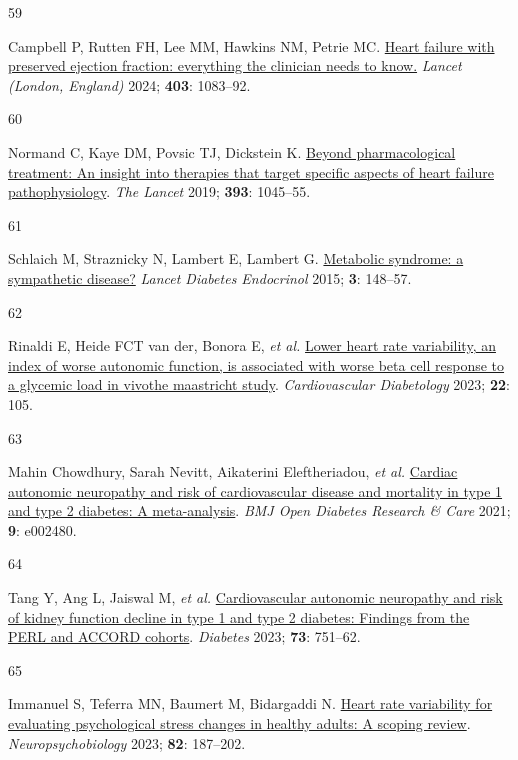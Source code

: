 \documentclass[
  a4paper,
  headsepline=true,
  open=left]{scrbook}
\newlength{\cslhangindent}
\newlength{\csllabelwidth}
\newlength{\cslentryspacingunit} %
\newenvironment{CSLReferences}[2] %
 {%
  \setlength{\parindent}{0pt}
  \ifodd #1
  \let\oldpar\par
  \def\par{\hangindent=\cslhangindent\oldpar}
  \fi
  \setlength{\parskip}{#2\cslentryspacingunit}
 }%
 {}
\newcommand{\CSLLeftMargin}[1]{\parbox[t]{\csllabelwidth}{#1}}
\newcommand{\CSLRightInline}[1]{\parbox[t]{\linewidth - \csllabelwidth}{#1}\break}
\begin{document}
\begin{CSLReferences}{0}{0}
\leavevmode{}%
\CSLLeftMargin{59 }%
\CSLRightInline{Campbell P, Rutten FH, Lee MM, Hawkins NM, Petrie MC.
\href{https://doi.org/10.1016/S0140-6736(23)02756-3}{Heart failure with
preserved ejection fraction: everything the clinician needs to know.}
\emph{Lancet (London, England)} 2024; \textbf{403}: 1083--92.}

\leavevmode{}%
\CSLLeftMargin{60 }%
\CSLRightInline{Normand C, Kaye DM, Povsic TJ, Dickstein K.
\href{https://doi.org/10.1016/S0140-6736(18)32216-5}{Beyond
pharmacological treatment: An insight into therapies that target
specific aspects of heart failure pathophysiology}. \emph{The Lancet}
2019; \textbf{393}: 1045--55.}

\leavevmode{}%
\CSLLeftMargin{61 }%
\CSLRightInline{Schlaich M, Straznicky N, Lambert E, Lambert G.
\href{https://doi.org/10.1016/s2213-8587(14)70033-6}{Metabolic syndrome:
a sympathetic disease?} \emph{Lancet Diabetes Endocrinol} 2015;
\textbf{3}: 148--57.}

\leavevmode{}%
\CSLLeftMargin{62 }%
\CSLRightInline{Rinaldi E, Heide FCT van der, Bonora E, \emph{et al.}
\href{https://doi.org/10.1186/s12933-023-01837-0}{Lower heart rate
variability, an index of worse autonomic function, is associated with
worse beta cell response to a glycemic load in vivo{\textemdash}the
maastricht study}. \emph{Cardiovascular Diabetology} 2023; \textbf{22}:
105.}

\leavevmode{}%
\CSLLeftMargin{63 }%
\CSLRightInline{Mahin Chowdhury, Sarah Nevitt, Aikaterini Eleftheriadou,
\emph{et al.} \href{https://doi.org/10.1136/bmjdrc-2021-002480}{Cardiac
autonomic neuropathy and risk of cardiovascular disease and mortality in
type 1 and type 2 diabetes: A meta-analysis}. \emph{BMJ Open Diabetes
Research \& Care} 2021; \textbf{9}: e002480.}

\leavevmode{}%
\CSLLeftMargin{64 }%
\CSLRightInline{Tang Y, Ang L, Jaiswal M, \emph{et al.}
\href{https://doi.org/10.2337/db23-0247}{Cardiovascular autonomic
neuropathy and risk of kidney function decline in type 1 and type 2
diabetes: Findings from the PERL and ACCORD cohorts}. \emph{Diabetes}
2023; \textbf{73}: 751--62.}

\leavevmode{}%
\CSLLeftMargin{65 }%
\CSLRightInline{Immanuel S, Teferra MN, Baumert M, Bidargaddi N.
\href{https://doi.org/10.1159/000530376}{Heart rate variability for
evaluating psychological stress changes in healthy adults: A scoping
review}. \emph{Neuropsychobiology} 2023; \textbf{82}: 187--202.}


\end{CSLReferences}
\end{document}
